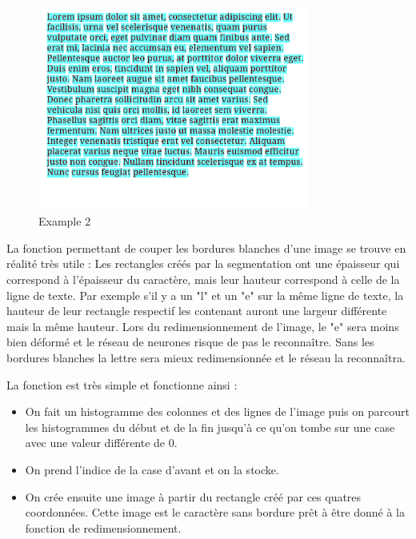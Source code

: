 \documentclass[12pt]{report}
\begin{document}
\begin{figure}
    \centering
    \includegraphics[width=0.8\textwidth]{Seg_example_2}
    \caption{Example 2}
\end{figure}

La fonction permettant de couper les bordures blanches d'une image se trouve en réalité très utile : Les rectangles créés par la segmentation ont une épaisseur qui correspond à l'épaisseur du caractère, mais leur hauteur correspond à celle de la ligne de texte. Par exemple s'il y a un "l" et un "e" sur la même ligne de texte, la hauteur de leur rectangle respectif les contenant auront une largeur différente mais la même hauteur. Lors du redimensionnement de l'image, le "e" sera moins bien déformé et le réseau de neurones risque de pas le reconnaître. Sans les bordures blanches la lettre sera mieux redimensionnée et le réseau la reconnaîtra.

\newpage

La fonction est très simple et fonctionne ainsi :
\begin{itemize}[label=\textbullet]
	\item On fait un histogramme des colonnes et des lignes de l'image puis on parcourt les histogrammes du début et de la fin jusqu'à ce qu'on tombe sur une case avec une valeur différente de 0. 
	\item On prend l'indice de la case d'avant et on la stocke.
	\item On crée ensuite une image à partir du rectangle créé par ces quatres coordonnées. Cette image est le caractère sans bordure prêt à être donné à la fonction de redimensionnement.
\end{itemize}
\end{document}
